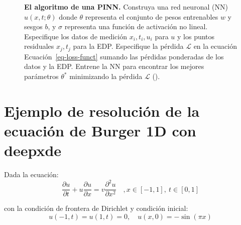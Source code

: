 \documentclass[
  spanish,
  us-letterpaper,
  DIV=11,
  numbers=noendperiod]{scrreprt}
\theoremstyle{plain}
\theoremstyle{definition}
\theoremstyle{remark}
\begin{document}
\begin{figure}


\caption{\label{fig-pinn_graph}\textbf{El algoritmo de una PINN.}
Construya una red neuronal (NN) \(u(x, t; \theta)\) donde \(\theta\)
representa el conjunto de pesos entrenables \(w\) y sesgos \(b\), y
\(\sigma\) representa una función de activación no lineal. Especifique
los datos de medición \({x_i, t_i, u_i}\) para \(u\) y los puntos
residuales \({x_j, t_j}\) para la EDP. Especifique la pérdida
\(\mathcal{L}\) en la ecuación Ecuación~\ref{eq-loss-funct} sumando las
pérdidas ponderadas de los datos y la EDP. Entrene la NN para encontrar
los mejores parámetros \(\mathbb{\theta^*}\) minimizando la pérdida
\(\mathcal{L}\) ().}

\end{figure}%

\section{Ejemplo de resolución de la ecuación de Burger 1D con
deepxde}\label{ejemplo-de-resoluciuxf3n-de-la-ecuaciuxf3n-de-burger-1d-con-deepxde}

Dada la ecuación: \[
\dfrac{\partial u}{\partial t} + u\dfrac{\partial u}{\partial x} = v\dfrac{\partial^2 u}{\partial x^2} \quad, x \in[-1,1], \ t\in[0,1]
\]

con la condición de frontera de Dirichlet y condición inicial: \[
u(-1,t) = u(1,t) = 0, \quad u(x,0)=-\sin(\pi x)
\]
\end{document}
